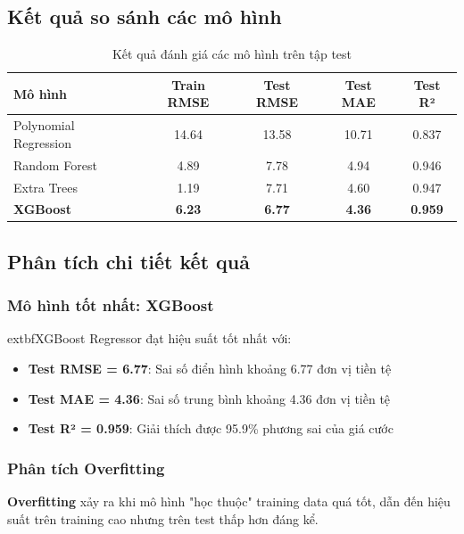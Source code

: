 \documentclass[12pt,a4paper]{article}
\begin{document}
\subsection{Kết quả so sánh các mô hình}

\begin{table}[H]
\centering
\caption{Kết quả đánh giá các mô hình trên tập test}
\label{tab:model_results}
\begin{tabular}{|l|c|c|c|c|}
\hline
\textbf{Mô hình} & \textbf{Train RMSE} & \textbf{Test RMSE} & \textbf{Test MAE} & \textbf{Test R²} \\
\hline
Polynomial Regression & 14.64 & 13.58 & 10.71 & 0.837 \\
\hline
Random Forest & 4.89 & 7.78 & 4.94 & 0.946 \\
\hline
Extra Trees & 1.19 & 7.71 & 4.60 & 0.947 \\
\hline
\textbf{XGBoost} & \textbf{6.23} & \textbf{6.77} & \textbf{4.36} & \textbf{0.959} \\
\hline
\end{tabular}
\end{table}

\subsection{Phân tích chi tiết kết quả}

\subsubsection{Mô hình tốt nhất: XGBoost}

	extbf{XGBoost Regressor} đạt hiệu suất tốt nhất với:
\begin{itemize}
    \item \textbf{Test RMSE = 6.77}: Sai số điển hình khoảng 6.77 đơn vị tiền tệ
    \item \textbf{Test MAE = 4.36}: Sai số trung bình khoảng 4.36 đơn vị tiền tệ
    \item \textbf{Test R² = 0.959}: Giải thích được 95.9\% phương sai của giá cước
\end{itemize}

\subsubsection{Phân tích Overfitting}

\begin{definitionbox}[Overfitting là gì?]
\textbf{Overfitting} xảy ra khi mô hình "học thuộc" training data quá tốt, dẫn đến hiệu suất trên training cao nhưng trên test thấp hơn đáng kể.
\end{definitionbox}
\end{document}
